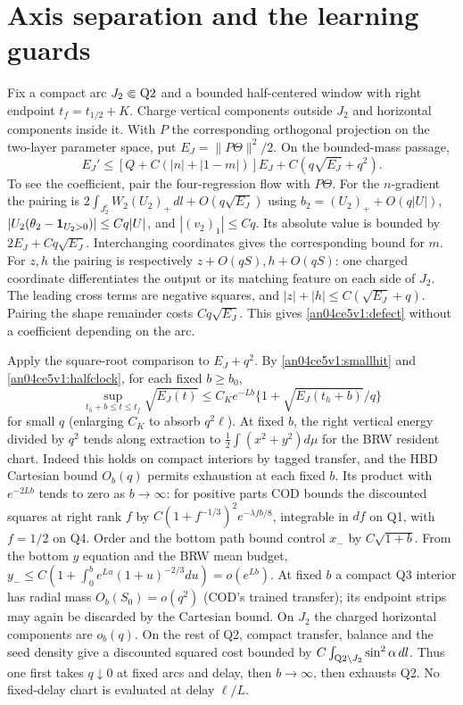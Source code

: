 \documentclass[11pt]{article}
\newcommand{\dd}{\,dl}
\begin{document}
\section{Axis separation and the learning guards}\label{an04ce5v1:guards}
Fix a compact arc $J_2\Subset{\rm Q2}$ and a bounded half-centered window with right endpoint $t_f=t_{1/2}+K$. Charge vertical components outside $J_2$ and horizontal components inside it. With $P$ the corresponding orthogonal projection on the two-layer parameter space, put $E_J=\|P\Theta\|^2/2$. On the bounded-mass passage,
\begin{equation}\label{an04ce5v1:defect}
 E_J'\le[Q+C(|n|+|1-m|)]E_J+C(q\sqrt{E_J}+q^2).
\end{equation}
To see the coefficient, pair the four-regression flow with $P\Theta$. For the $n$-gradient the pairing is $2\int_{J_2^c}W_2(U_2)_+\dd+O(q\sqrt{E_J})$ using $b_2=(U_2)_++O(q|U|)$, $|U_2(\theta_2-{\bf1}_{U_2>0})|\le Cq|U|$, and $|(v_2)_1|\le Cq$. Its absolute value is bounded by $2E_J+Cq\sqrt{E_J}$. Interchanging coordinates gives the corresponding bound for $m$. For $z,h$ the pairing is respectively $z+O(qS), h+O(qS)$: one charged coordinate differentiates the output or its matching feature on each side of $J_2$. The leading cross terms are negative squares, and $|z|+|h|\le C(\sqrt{E_J}+q)$. Pairing the shape remainder costs $Cq\sqrt{E_J}$. This gives \eqref{an04ce5v1:defect} without a coefficient depending on the arc.

Apply the square-root comparison to $E_J+q^2$. By \eqref{an04ce5v1:smallhit} and \eqref{an04ce5v1:halfclock}, for each fixed $b\ge b_0$,
\[
 \sup_{t_h+b\le t\le t_f}\sqrt{E_J(t)}
 \le C_K e^{-Lb}\{1+\sqrt{E_J(t_h+b)}/q\}
\]
for small $q$ (enlarging $C_K$ to absorb $q^2\ell$). At fixed $b$, the right vertical energy divided by $q^2$ tends along extraction to $\tfrac12\int (x^2+y^2)d\mu$ for the BRW resident chart. Indeed this holds on compact interiors by tagged transfer, and the HBD Cartesian bound $O_b(q)$ permits exhaustion at each fixed $b$. Its product with $e^{-2Lb}$ tends to zero as $b\to\infty$: for positive parts COD bounds the discounted squares at right rank $f$ by $C(1+f^{-1/3})^2e^{-\lambda f b/8}$, integrable in $df$ on Q1, with $f=1/2$ on Q4. Order and the bottom path bound control $x_-$ by $C\sqrt{1+b}$. From the bottom $y$ equation and the BRW mean budget, $y_-\le C(1+\int_0^b e^{Lu}(1+u)^{-2/3}du)=o(e^{Lb})$.
At fixed $b$ a compact Q3 interior has radial mass $O_b(S_0)=o(q^2)$ (COD's trained transfer); its endpoint strips may again be discarded by the Cartesian bound. On $J_2$ the charged horizontal components are $o_b(q)$. On the rest of Q2, compact transfer, balance and the seed density give a discounted squared cost bounded by $C\int_{{\rm Q2}\setminus J_2}\sin^2\alpha\dd$. Thus one first takes $q\downarrow0$ at fixed arcs and delay, then $b\to\infty$, then exhausts Q2. No fixed-delay chart is evaluated at delay $\ell/L$.
\end{document}
